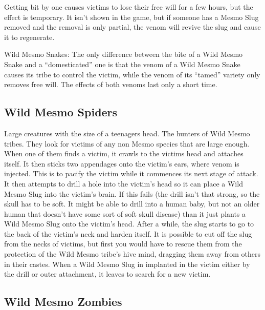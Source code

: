 \documentclass{gd-document}
\begin{document}
Getting bit by one causes victims to lose their free will for a few
hours, but the effect is temporary. It isn't shown in the game, but if
someone has a Mesmo Slug removed and the removal is only partial, the
venom will revive the slug and cause it to regenerate.

Wild Mesmo Snakes: The only difference between the bite of a Wild
Mesmo Snake and a “domesticated” one is that the venom of a Wild Mesmo
Snake causes its tribe to control the victim, while the venom of its
“tamed” variety only removes free will. The effects of both venoms
last only a short time.

\subsection{Wild Mesmo Spiders}

Large creatures with the size of a teenagers head. The hunters of Wild
Mesmo tribes. They look for victims of any non Mesmo species that are
large enough. When one of them finds a victim, it crawls to the
victims head and attaches itself. It then sticks two appendages onto
the victim's ears, where venom is injected. This is to pacify the
victim while it commences its next stage of attack. It then attempts
to drill a hole into the victim's head so it can place a Wild Mesmo
Slug into the victim's brain. If this fails (the drill isn't that
strong, so the skull has to be soft. It might be able to drill into a
human baby, but not an older human that doesn't have some sort of soft
skull disease) than it just plants a Wild Mesmo Slug onto the victim's
head. After a while, the slug starts to go to the back of the victim's
neck and harden itself. It is possible to cut off the slug from the
necks of victims, but first you would have to rescue them from the
protection of the Wild Mesmo tribe's hive mind, dragging them away
from others in their castes. When a Wild Mesmo Slug in implanted in
the victim either by the drill or outer attachment, it leaves to
search for a new victim.

\subsection{Wild Mesmo Zombies}
\end{document}
